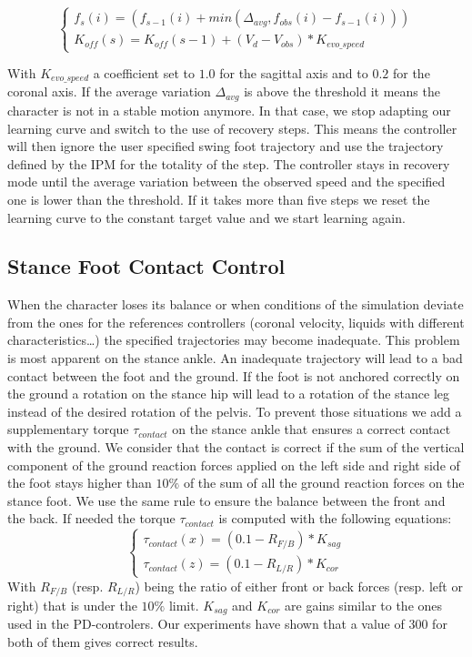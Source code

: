 \documentclass[runningheads,a4paper,10pt]{llncs}
\begin{document}
\begin{equation}
\begin{cases}
f_s(i)= (f_{s-1}(i) + min(\Delta_{avg},f_{obs}(i) - f_{s-1}(i))) \\ 
K_{off}(s)=K_{off}(s-1)+  (V_d - V_{obs})*K_{evo\_speed}
\end{cases}
\end{equation}

With $K_{evo\_speed}$ a coefficient set to $1.0$ for the sagittal axis and to $0.2$ for the coronal axis.
If the average variation $\Delta_{avg}$ is above the threshold it means the character is not in a stable motion anymore.
In that case, we stop adapting our learning curve and switch to the use of recovery steps. This means the controller will then ignore the user specified swing foot trajectory and use the trajectory defined by the IPM for the totality of the step. The controller stays in recovery mode until the average variation between the observed speed and the specified one is lower than the threshold. If it takes more than five steps we reset the learning curve to the constant target value and we start learning again. 

\subsection{Stance Foot Contact Control}
\label{sec:stance_foot_contact_control}

When the character loses its balance or when conditions of the simulation deviate from the ones for the references controllers (coronal velocity, liquids with different characteristics…) the specified trajectories may become inadequate. This problem is most apparent on the stance ankle. An inadequate trajectory will lead to a bad contact between the foot and the ground. If the foot is not anchored correctly on the ground a rotation on the stance hip will lead to a rotation of the stance leg instead of the desired rotation of the pelvis. To prevent those situations we add a supplementary torque $\tau _{contact}$ on the stance ankle that ensures a correct contact with the ground. We consider that the contact is correct if the sum of the vertical component of the ground reaction forces applied on the left side and right side of the foot stays higher than $10\%$ of the sum of all the ground reaction forces on the stance foot. We use the same rule to ensure the balance between the front and the back. If needed the torque $\tau _{contact}$ is computed with the following equations:
\begin{equation}
\begin{cases}
\tau _{contact}(x)= (0.1- R_{F/B}) * K_{sag}\\
\tau _{contact}(z)= (0.1- R_{L/R}) * K_{cor}
\end{cases}
\end{equation}
With $R_{F/B}$ (resp. $R_{L/R}$) being the ratio of either front or back forces (resp. left or right) that is under the $10\%$ limit. $K_{sag}$ and $K_{cor}$ are gains similar to the ones used in the PD-controlers. Our experiments have shown that a value of 300 for both of them gives correct results.
\end{document}
